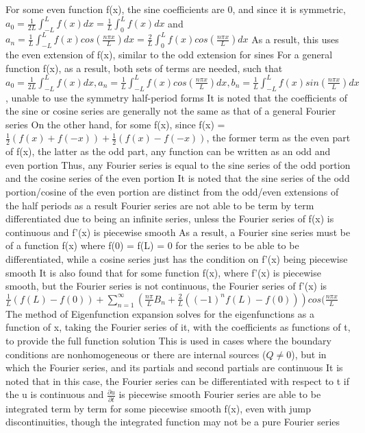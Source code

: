 \documentclass[11 pt, twoside]{article}
\newenvironment{outline*}
{
	\begin{outline}[enumerate]
	}
	{\end{outline}
}
\begin{document}
\begin{outline*}
\1 For some even function f(x), the sine coefficients are 0, and since it is symmetric, $a_0 = \frac{1}{2L} \int^L_{-L} f(x)dx = \frac{1}{L} \int^L_0 f(x)dx$ and $a_n = \frac{1}{L} \int^L_{-L} f(x)cos(\frac{n\pi x}{L})dx = \frac{2}{L} \int^L_0 f(x)cos(\frac{n\pi x}{L})dx$
	\2 As a result, this uses the even extension of f(x), similar to the odd extension for sines
\1 For a general function f(x), as a result, both sets of terms are needed, such that $a_0 = \frac{1}{2L}\int^L_{-L} f(x)dx, a_n = \frac{1}{L} \int^L_{-L} f(x) cos(\frac{n\pi x}{L})dx, b_n = \frac{1}{L} \int^L_{-L} f(x) sin(\frac{n\pi x}{L})dx$, unable to use the symmetry half-period forms
	\2 It is noted that the coefficients of the sine or cosine series are generally not the same as that of a general Fourier series
	\2 On the other hand, for some f(x), since f(x) = $\frac{1}{2}(f(x) + f(-x)) + \frac{1}{2}(f(x) - f(-x))$, the former term as the even part of f(x), the latter as the odd part, any function can be written as an odd and even portion
		\3 Thus, any Fourier series is equal to the sine series of the odd portion and the cosine series of the even portion
		\3 It is noted that the sine series of the odd portion/cosine of the even portion are distinct from the odd/even extensions of the half periods as a result
\1 Fourier series are not able to be term by term differentiated due to being an infinite series, unless the Fourier series of f(x) is continuous and f'(x) is piecewise smooth
	\2 As a result, a Fourier sine series must be of a function f(x) where f(0) = f(L) = 0 for the series to be able to be differentiated, while a cosine series just has the condition on f'(x) being piecewise smooth
	\2 It is also found that for some function f(x), where f'(x) is piecewise smooth, but the Fourier series is not continuous, the Fourier series of f'(x) is $\frac{1}{L}(f(L) - f(0)) + \sum_{n = 1}^{\infty} (\frac{n\pi}{L}B_n + \frac{2}{L}((-1)^nf(L) - f(0)))cos(\frac{n\pi x}{L}$
	\2 The method of Eigenfunction expansion solves for the eigenfunctions as a function of x, taking the Fourier series of it, with the coefficients as functions of t, to provide the full function solution
		\3 This is used in cases where the boundary conditions are nonhomogeneous or there are internal sources ($Q \neq 0$), but in which the Fourier series, and its partials and second partials are continuous
		\3 It is noted that in this case, the Fourier series can be differentiated with respect to t if the u is continuous and $\frac{\partial u}{\partial t}$ is piecewise smooth
\1 Fourier series are able to be integrated term by term for some piecewise smooth f(x), even with jump discontinuities, though the integrated function may not be a pure Fourier series

\end{outline*}
\end{document}
